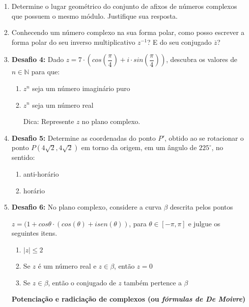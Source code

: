 \documentclass[a4paper, 11pt]{article}
\begin{document}
\begin{enumerate}
\item Determine o lugar geométrico do conjunto de afixos de números complexos que possuem o mesmo módulo. Justifique sua resposta.	

\item Conhecendo um número complexo na sua forma polar, como posso escrever a forma polar do seu inverso multiplicativo $z^{-1}$? E do seu conjugado $\overline{z}$?

\item \textbf{Desafio 4:} Dado $z = 7\cdot(cos(\dfrac{\pi}{4}) + i\cdot sin(\dfrac{\pi}{4}))$, descubra os valores de $n \in \mathbb{N}$ para que:
	\begin{enumerate}
	\item $z^n$ seja um número imaginário puro
	\item $z^n$ seja um número real
	
	Dica: Represente $z$ no plano complexo.
	\end{enumerate}

\item \textbf {Desafio 5:} Determine as coordenadas do ponto $P'$, obtido ao se rotacionar o ponto $ P(4\sqrt{2} , 4\sqrt{2})$  em torno da origem, em um ângulo de $225^{\circ}$, no sentido:
	\begin{enumerate}
	\item anti-horário
	\item horário
	\end{enumerate}
	
\item \textbf{Desafio 6:}  No plano complexo, considere a curva $\beta$ descrita pelos pontos 

$z = (1 + cos\theta \cdot (cos(\theta) + isen(\theta))$, para $\theta \in [-\pi, \pi]$ e julgue os seguintes itens.
	\begin{enumerate}
	\item $|z| \leq 2$
	\item Se $z$ é um número real e $z \in \beta$, então $z = 0$
	\item Se $z \in \beta$, então o conjugado de $z$ também pertence a $\beta$
	\end{enumerate}



\begin{center}
	\textbf{Potenciação e radiciação de complexos (ou \textit{fórmulas de De Moivre})}
	\\
\end{center}



\end{enumerate}
\end{document}
